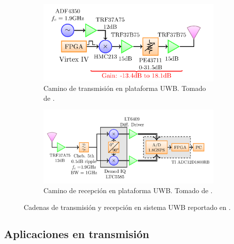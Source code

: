 \begin{figure}[t]
    \centering
    \begin{subfigure}[b]{0.45\textwidth}
        \centering
        \includegraphics[width=\textwidth]{images/uwb_system_tx_path.png}
        \caption{Camino de transmisión en plataforma UWB. Tomado de
        \cite{Altieri2021}.}
        \label{fig:uwb_system_tx_path}
    \end{subfigure}
    \hfill
    \begin{subfigure}[b]{0.45\textwidth}
        \centering
        \includegraphics[width=\textwidth]{images/uwb_system_rx_path.png}
        \caption{Camino de recepción en plataforma UWB. Tomado de
        \cite{Altieri2021}.}
        \label{fig:uwb_system_rx_path}
    \end{subfigure}
        \caption{Cadenas de transmisión y recepción en sistema UWB reportado en
        \cite{Altieri2021}.}
    \label{fig:uwb_system_block_diagram}
\end{figure}

\subsection{Aplicaciones en transmisión}

